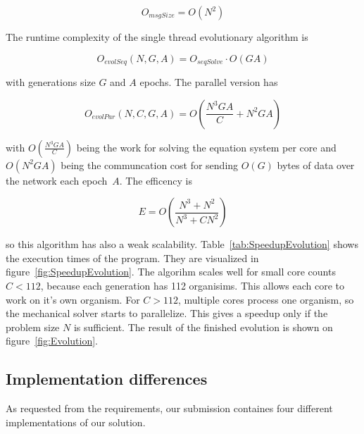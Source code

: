 \documentclass[12pt]{article}
\begin{document}
\begin{equation}
    O_{msgSize} = O(N^2)
\end{equation}

The runtime complexity of the single thread evolutionary algorithm is

\begin{equation}
    O_\mathit{evolSeq}(N, G, A) = O_\textit{seqSolve} \cdot O(G A)
\end{equation}

with generations size $G$ and $A$ epochs. The parallel version has

\begin{equation}
    O_\mathit{evolPar}(N, C, G, A) = O \left( \frac{N^3 G A}{C} + N^2 G A\right)
\end{equation}

with $O (\frac{N^3 G A}{C} )$ being the work for solving the equation system per core and $O(N^2 G A)$ being the communcation cost for sending $O(G)$ bytes of data over the network each epoch~$A$. The efficency is

\begin{equation}
    E = O \left(\frac{N^3 + N^2}{N^3+C N^2}\right)
\end{equation}

so this algorithm has also a weak scalability. Table~\ref{tab:SpeedupEvolution} shows the execution times of the program. They are visualized in figure~\ref{fig:SpeedupEvolution}. The algorihm scales well for small core counts $C < 112$, because each generation has 112 organisims. This allows each core to work on it's own organism. For $C > 112$, multiple cores process one organism, so the mechanical solver starts to parallelize. This gives a speedup only if the problem size $N$ is sufficient. The result of the finished evolution is shown on figure~\ref{fig:Evolution}.

\subsection{Implementation differences}

As requested from the requirements, our submission containes four different implementations of our solution.
\end{document}
